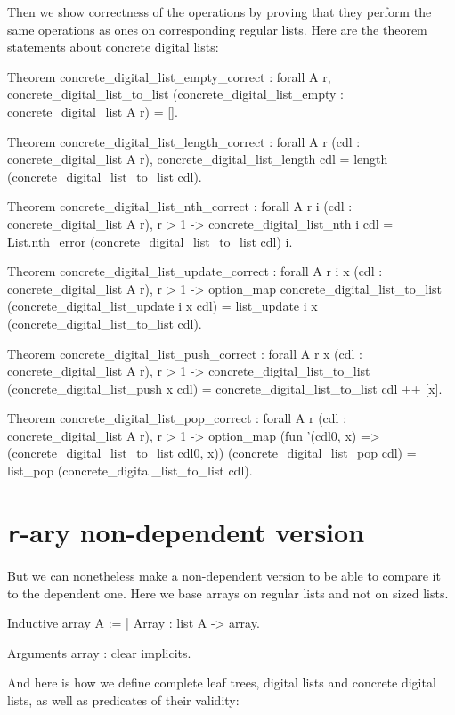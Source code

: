 \documentclass{article}
\begin{document}
Then we show correctness of the operations by proving that they perform the same operations as ones on corresponding regular lists. Here are the theorem statements about concrete digital lists:

\begin{coq}
Theorem concrete_digital_list_empty_correct :
  forall {A r},
  concrete_digital_list_to_list (concrete_digital_list_empty : concrete_digital_list A r) = [].

Theorem concrete_digital_list_length_correct :
  forall {A r} (cdl : concrete_digital_list A r),
  concrete_digital_list_length cdl = length (concrete_digital_list_to_list cdl).

Theorem concrete_digital_list_nth_correct :
  forall {A r} i (cdl : concrete_digital_list A r),
  r > 1 ->
  concrete_digital_list_nth i cdl = List.nth_error (concrete_digital_list_to_list cdl) i.

Theorem concrete_digital_list_update_correct :
  forall {A r} i x (cdl : concrete_digital_list A r),
  r > 1 ->
  option_map concrete_digital_list_to_list (concrete_digital_list_update i x cdl) =
    list_update i x (concrete_digital_list_to_list cdl).

Theorem concrete_digital_list_push_correct :
  forall {A r} x (cdl : concrete_digital_list A r),
  r > 1 ->
  concrete_digital_list_to_list (concrete_digital_list_push x cdl) =
    concrete_digital_list_to_list cdl ++ [x].

Theorem concrete_digital_list_pop_correct :
  forall {A r} (cdl : concrete_digital_list A r),
  r > 1 ->
  option_map
    (fun '(cdl0, x) => (concrete_digital_list_to_list cdl0, x))
    (concrete_digital_list_pop cdl) = list_pop (concrete_digital_list_to_list cdl).
\end{coq}

\section{\texttt{r}-ary non-dependent version}

But we can nonetheless make a non-dependent version to be able to compare it to the dependent one. Here we base arrays on regular lists and not on sized lists.

\begin{coq}
Inductive array {A} :=
  | Array : list A -> array.

Arguments array : clear implicits.
\end{coq}

And here is how we define complete leaf trees, digital lists and concrete digital lists, as well as predicates of their validity:
\end{document}
